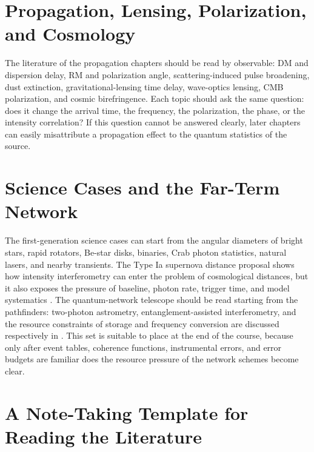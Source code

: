 \section{Propagation, Lensing, Polarization, and Cosmology}
\label{appsec:g-propagation}

The literature of the propagation chapters should be read by observable: DM and dispersion delay, RM and polarization angle, scattering-induced pulse broadening, dust extinction, gravitational-lensing time delay, wave-optics lensing, CMB polarization, and cosmic birefringence. Each topic should ask the same question: does it change the arrival time, the frequency, the polarization, the phase, or the intensity correlation? If this question cannot be answered clearly, later chapters can easily misattribute a propagation effect to the quantum statistics of the source.

\section{Science Cases and the Far-Term Network}
\label{appsec:g-cases}

The first-generation science cases can start from the angular diameters of bright stars, rapid rotators, Be-star disks, binaries, Crab photon statistics, natural lasers, and nearby transients. The Type Ia supernova distance proposal shows how intensity interferometry can enter the problem of cosmological distances, but it also exposes the pressure of baseline, photon rate, trigger time, and model systematics \citep{2025PhRvD.111h3047K}. The quantum-network telescope should be read starting from the pathfinders: two-photon astrometry, entanglement-assisted interferometry, and the resource constraints of storage and frequency conversion are discussed respectively in \citet{2023PhRvL.130p0801M,2025PhRvA.111d3701M,2025PhRvR...7d3278Z,2026PhRvA.113a2608P,2026Natur.651..326S}. This set is suitable to place at the end of the course, because only after event tables, coherence functions, instrumental errors, and error budgets are familiar does the resource pressure of the network schemes become clear.

\section{A Note-Taking Template for Reading the Literature}
\label{appsec:g-reading-template}

